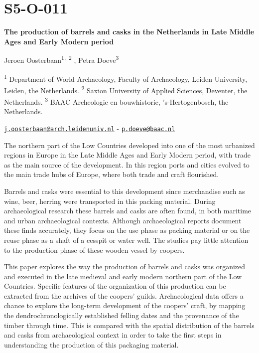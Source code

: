\documentclass[
]{book}
\begin{document}
\hypertarget{s5-o-011}{%
\section*{S5-O-011}\label{s5-o-011}}

\textbf{The production of barrels and casks in the Netherlands in Late Middle Ages and Early Modern period}

Jeroen Oosterbaan\textsuperscript{1,~2} , Petra Doeve\textsuperscript{3}

\textsuperscript{1} Department of World Archaeology, Faculty of Archaeology, Leiden University, Leiden, the Netherlands. \textsuperscript{2} Saxion University of Applied Sciences, Deventer, the Netherlands. \textsuperscript{3} BAAC Archeologie en bouwhistorie, 's-Hertogenbosch, the Netherlands.

\href{mailto:j.oosterbaan@arch.leidenuniv.nl}{\nolinkurl{j.oosterbaan@arch.leidenuniv.nl}} - \href{mailto:p.doeve@baac.nl}{\nolinkurl{p.doeve@baac.nl}}

The northern part of the Low Countries developed into one of the most urbanized regions in Europe in the Late Middle Ages and Early Modern period, with trade as the main source of the development. In this region ports and cities evolved to the main trade hubs of Europe, where both trade and craft flourished.

Barrels and casks were essential to this development since merchandise such as wine, beer, herring were transported in this packing material. During archaeological research these barrels and casks are often found, in both maritime and urban archaeological contexts. Although archaeological reports document these finds accurately, they focus on the use phase as packing material or on the reuse phase as a shaft of a cesspit or water well. The studies pay little attention to the production phase of these wooden vessel by coopers.

This paper explores the way the production of barrels and casks was organized and executed in the late medieval and early modern northern part of the Low Countries. Specific features of the organization of this production can be extracted from the archives of the coopers' guilds. Archaeological data offers a chance to explore the long-term development of the coopers' craft, by mapping the dendrochronologically established felling dates and the provenance of the timber through time. This is compared with the spatial distribution of the barrels and casks from archaeological context in order to take the first steps in understanding the production of this packaging material.
\end{document}
